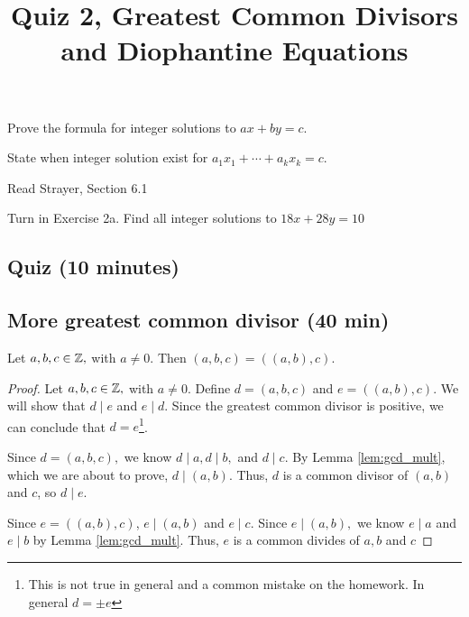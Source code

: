 \documentclass{../ximera}
\title{Quiz 2, Greatest Common Divisors and Diophantine Equations}
\begin{document}
\begin{abstract}
\end{abstract}
\maketitle


\begin{obj}
	\item Prove the formula for integer solutions to $ax+by=c$.
	\item State when integer solution exist for $a_1x_1+\cdots+a_kx_k=c$.
\end{obj}

\begin{pre}
 \item[Read] Strayer, Section 6.1
 \item[Turn in] Exercise 2a.
 Find all integer solutions to $18x+28y=10$
\end{pre}


\subsection{Quiz (10 minutes)}
\subsection{More greatest common divisor (40 min)} 

\begin{lemma}\label{lem:gcd_3case}
	Let $a,b,c\in\mathbb Z,$ with $a\neq 0$. Then $(a,b,c)=((a,b),c).$
\end{lemma}

 \begin{proof}
 	Let $a,b,c\in\mathbb Z,$ with $a\neq 0$. Define $d=(a,b,c)$ and $e=((a,b),c).$ We will show that $d\mid e$ and $e\mid d$. Since the greatest common divisor is positive, we can conclude that $d=e$\footnote{This is not true in general and a common mistake on the homework. In general $d=\pm e$}.

 	Since $d=(a,b,c),$ we know $d\mid a, d\mid b,$ and $d\mid c$. By Lemma \ref{lem:gcd_mult}, which we are about to prove, $d\mid (a,b)$. Thus, $d$ is a common divisor of $(a,b)$ and $c$, so $d\mid e$.

 	Since $e=((a,b),c)$, $e\mid  (a,b)$ and $e\mid c$. Since $e\mid (a,b),$ we know $e\mid a$ and $e\mid b$ by Lemma \ref{lem:gcd_mult}. Thus, $e$ is a common divides of $a,b$ and $c$
 \end{proof}
\end{document}
